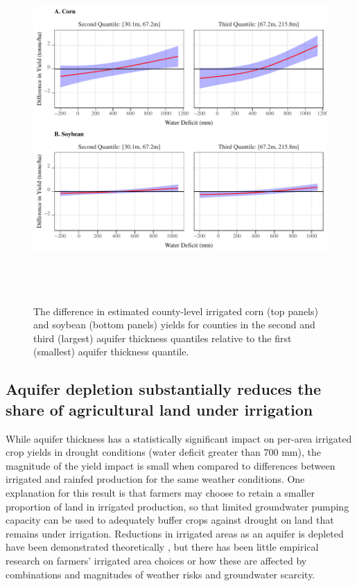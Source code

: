 \documentclass[
]{article}
\begin{document}
\begin{figure}[H]

{\centering \includegraphics[width=6in,height=500px,]{../../Figures/g_ir_yield_dif} 

}

\caption{The difference in estimated county-level irrigated corn (top panels) and soybean (bottom panels) yields for counties in the second and third (largest) aquifer thickness quantiles relative to the first (smallest) aquifer thickness quantile.}\label{fig:yield-dif}
\end{figure}

\hypertarget{impact-share}{%
\subsection{Aquifer depletion substantially reduces the share of agricultural land under irrigation}\label{impact-share}}

While aquifer thickness has a statistically significant impact on per-area irrigated crop yields in drought conditions (water deficit greater than 700 mm), the magnitude of the yield impact is small when compared to differences between irrigated and rainfed production for the same weather conditions. One explanation for this result is that farmers may choose to retain a smaller proportion of land in irrigated production, so that limited groundwater pumping capacity can be used to adequately buffer crops against drought on land that remains under irrigation. Reductions in irrigated areas as an aquifer is depleted have been demonstrated theoretically \citep{rad2020effects, foster2014modeling, hrozencik2017heterogeneous, deines2020transitions}, but there has been little empirical research on farmers' irrigated area choices or how these are affected by combinations and magnitudes of weather risks and groundwater scarcity.
\end{document}
